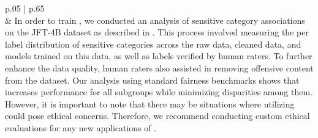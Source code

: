 {\begin{longtable}[c]{ p{} | p{} }
\\ \midrule
{} & 
In order to train \chonk, we conducted an analysis of sensitive category associations on the JFT-4B dataset as described in \citet{aka2021measuring}. This process involved measuring the per label distribution of sensitive categories across the raw data, cleaned data, and models trained on this data, as well as labels verified by human raters. To further enhance the data quality, human raters also assisted in removing offensive content from the dataset. Our analysis using standard fairness benchmarks shows that \chonk increases performance for all subgroups while minimizing disparities among them. However, it is important to note that there may be situations where utilizing \chonk could pose ethical concerns. Therefore, we recommend conducting custom ethical evaluations for any new applications of \chonk.
\\
\bottomrule
\end{longtable}
}
\newpage  %


